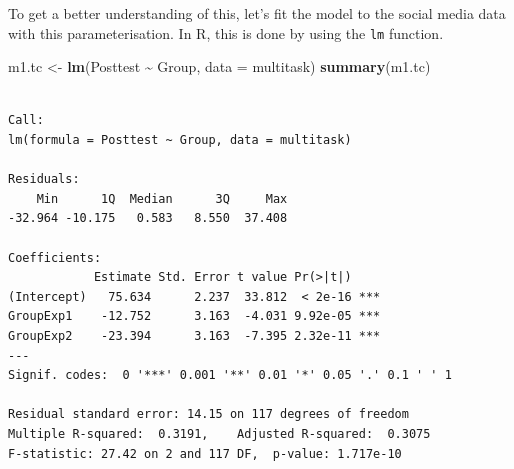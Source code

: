 \documentclass[
  letterpaper,
]{book}
\newenvironment{Shaded}{\begin{snugshade}}{\end{snugshade}}
\newcommand{\AttributeTok}[1]{\textcolor[rgb]{0.13,0.29,0.53}{#1}}
\newcommand{\FunctionTok}[1]{\textcolor[rgb]{0.13,0.29,0.53}{\textbf{#1}}}
\newcommand{\NormalTok}[1]{#1}
\newcommand{\OtherTok}[1]{\textcolor[rgb]{0.56,0.35,0.01}{#1}}
\newcommand{\SpecialCharTok}[1]{\textcolor[rgb]{0.81,0.36,0.00}{\textbf{#1}}}
\begin{document}

To get a better understanding of this, let's fit the model to the social
media data with this parameterisation. In R, this is done by using the
\texttt{lm} function.

\begin{Shaded}
\begin{Highlighting}[]
\NormalTok{m1.tc }\OtherTok{\textless{}{-}} \FunctionTok{lm}\NormalTok{(Posttest }\SpecialCharTok{\textasciitilde{}}\NormalTok{ Group, }\AttributeTok{data =}\NormalTok{ multitask)}
\FunctionTok{summary}\NormalTok{(m1.tc)}
\end{Highlighting}
\end{Shaded}

\begin{verbatim}

Call:
lm(formula = Posttest ~ Group, data = multitask)

Residuals:
    Min      1Q  Median      3Q     Max 
-32.964 -10.175   0.583   8.550  37.408 

Coefficients:
            Estimate Std. Error t value Pr(>|t|)    
(Intercept)   75.634      2.237  33.812  < 2e-16 ***
GroupExp1    -12.752      3.163  -4.031 9.92e-05 ***
GroupExp2    -23.394      3.163  -7.395 2.32e-11 ***
---
Signif. codes:  0 '***' 0.001 '**' 0.01 '*' 0.05 '.' 0.1 ' ' 1

Residual standard error: 14.15 on 117 degrees of freedom
Multiple R-squared:  0.3191,    Adjusted R-squared:  0.3075 
F-statistic: 27.42 on 2 and 117 DF,  p-value: 1.717e-10
\end{verbatim}
\end{document}
